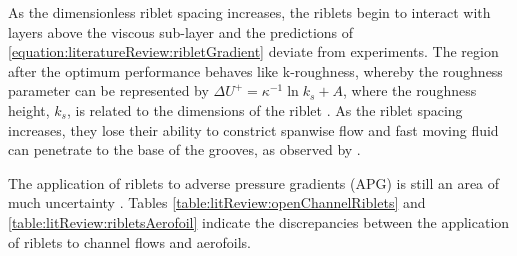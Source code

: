 \documentclass[12pt,oneside,a4paper]{article}
\begin{document}
As the dimensionless riblet spacing increases, the riblets begin to interact with layers above the viscous sub-layer and the predictions of \eqref{equation:literatureReview:ribletGradient} deviate from experiments. The region after the optimum performance behaves like k-roughness, whereby the roughness parameter can be represented by $\Delta U^+ = \kappa^{-1} \ln k_s + A$, where the roughness height, $k_s$, is related to the dimensions of the riblet \citep{jimenez2004}. As the riblet spacing increases, they lose their ability to constrict spanwise flow and fast moving fluid can penetrate to the base of the grooves, as observed by \cite{lee2001}. 

The application of riblets to adverse pressure gradients (APG) is still an area of much uncertainty \citep{boomsma2015}. Tables \ref{table:litReview:openChannelRiblets} and \ref{table:litReview:ribletsAerofoil} indicate the discrepancies between the application of riblets to channel flows and aerofoils.
%
\end{document}
